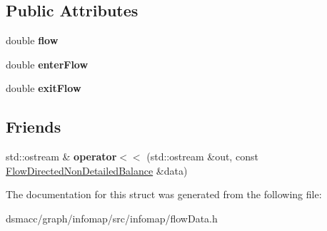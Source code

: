 \subsection*{Public Attributes}
\begin{DoxyCompactItemize}
\item 
\mbox{\label{structFlowDirectedNonDetailedBalance_a6c5ac62b397291cafad070e860944740}} 
double {\bfseries flow}
\item 
\mbox{\label{structFlowDirectedNonDetailedBalance_ac8bd9b1b2f0e71e55818884d17bf0f06}} 
double {\bfseries enter\+Flow}
\item 
\mbox{\label{structFlowDirectedNonDetailedBalance_af02aae98c0b4efde62032081d48c5b09}} 
double {\bfseries exit\+Flow}
\end{DoxyCompactItemize}
\subsection*{Friends}
\begin{DoxyCompactItemize}
\item 
\mbox{\label{structFlowDirectedNonDetailedBalance_aa17e44319e5f0d98f4d8a23f915e9211}} 
std\+::ostream \& {\bfseries operator$<$$<$} (std\+::ostream \&out, const \mbox{\hyperlink{structFlowDirectedNonDetailedBalance}{Flow\+Directed\+Non\+Detailed\+Balance}} \&data)
\end{DoxyCompactItemize}


The documentation for this struct was generated from the following file\+:\begin{DoxyCompactItemize}
\item 
dsmacc/graph/infomap/src/infomap/flow\+Data.\+h\end{DoxyCompactItemize}
